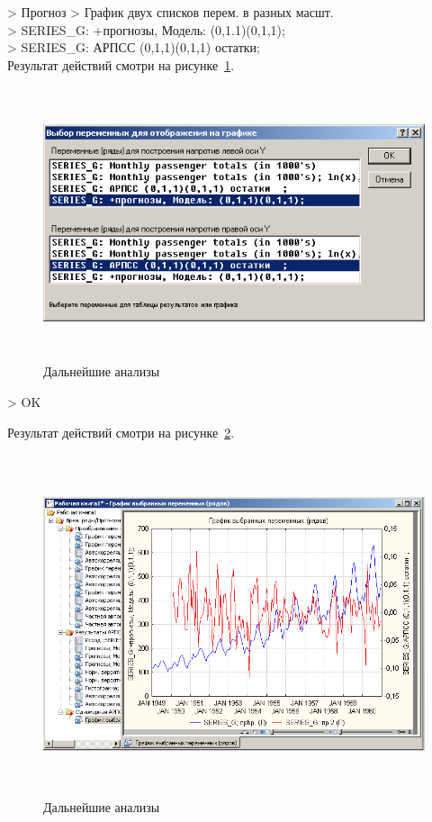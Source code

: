\newpage

> Прогноз > График двух списков перем. в разных масшт.\\
> SERIES\_G: +прогнозы, Модель: (0,1.1)(0,1,1);\\
> SERIES\_G: АРПСС (0,1,1)(0,1,1) остатки;\\

Результат действий смотри на рисунке~\ref{fig:22}.

\begin{figure}[!h]
  \centering

  \includegraphics[height=8cm]
  {inc/Series_G/22.PNG}

  \caption{Дальнейшие анализы}

  \label{fig:22}
\end{figure}

> OK

Результат действий смотри на рисунке~\ref{fig:23}.

\begin{figure}[!h]
  \centering

  \includegraphics[height=10cm]
  {inc/Series_G/23.PNG}

  \caption{Дальнейшие анализы}

  \label{fig:23}
\end{figure}

